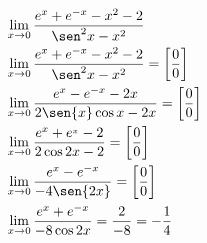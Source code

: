 \begin{ex}
\begin{align}
&\lim_{x\rightarrow 0} \frac{e^{x}+e^{-x}-x^2-2}{\sen^2{x}-x^2}\nonumber\\
&\lim_{x\rightarrow 0} \frac{e^{x}+e^{-x}-x^2-2}{\sen^2{x}-x^2}= \left[\frac{0}{0}\right]\nonumber\\
&\lim_{x\rightarrow 0} \frac{e^{x}-e^{-x}-2x}{2\sen{x}\cos{x}-2x}=\left[\frac{0}{0}\right]\nonumber\\
&\lim_{x\rightarrow 0} \frac{e^{x}+e^{_x}-2}{2\cos{2x}-2}=\left[\frac{0}{0}\right]\nonumber\\
&\lim_{x\rightarrow 0} \frac{e^{x}-e^{-x}}{-4\sen{2x}}=\left[\frac{0}{0}\right]\nonumber\\
&\lim_{x\rightarrow 0} \frac{e^{x}+e^{-x}}{-8\cos{2x}}=\frac{2}{-8}=-\frac{1}{4}\nonumber
\end{align}
\end{ex}
